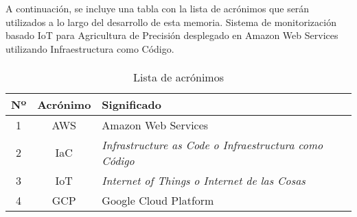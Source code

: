 \documentclass[../../memoria.tex]{subfiles}
\begin{document}
A continuación, se incluye una tabla con la lista de acrónimos que serán utilizados a lo largo del desarrollo de
esta memoria.
Sistema de monitorización basado IoT para Agricultura de Precisión desplegado en Amazon Web Services
utilizando Infraestructura como Código.

\paragraph{}

\begin{table}[h]
    \centering
    \begin{tabular}{ccl}
        \hline
        \multicolumn{1}{l}{\textbf{Nº}} & \multicolumn{1}{l}{\textbf{Acrónimo}} & \textbf{Significado}                                          \\ \hline
        1                               & AWS                                   & Amazon Web Services                                           \\
        2                               & IaC                                   & \textit{Infrastructure as Code o Infraestructura como Código} \\
        3                               & IoT                                   & \textit{Internet of Things o Internet de las Cosas}           \\
        4                               & GCP                                   & Google Cloud Platform                                         \\ \hline
    \end{tabular}
    \caption {Lista de acrónimos}
\end{table}
\end{document}
